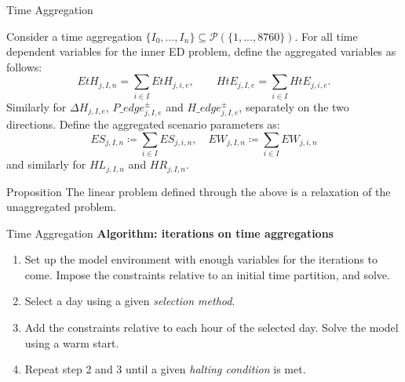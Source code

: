 \documentclass[pdf]{beamer}
\begin{document}
  \begin{frame}{Time Aggregation}


    \small
    Consider a time aggregation $\{I_0,...,I_n\}\subseteq \mathcal{P}(\{1,...,8760\})$.
    For all time dependent variables for the inner ED problem, define the aggregated variables as follows:
    \begin{equation*}
    EtH_{j,I,n} = \sum_{i \in I} EtH_{j,i,e}, \quad\quad HtE_{j,I,e} = \sum_{i \in I} HtE_{j,i,e}.
    \end{equation*}
    Similarly for \(\Delta H_{j,I,e}\), \(P\_edge^\pm_{j,I,e}\) and \(H\_edge^\pm_{j,I,e}\), separately on the two directions.
    Define the aggregated scenario parameters as:
    \[
    ES_{j,I,n} \coloneqq \sum_{i \in I} ES_{j,i,n}, \quad EW_{j,I,n} \coloneqq \sum_{i \in I} EW_{j,i,n}
    \]
    and similarly for \(HL_{j,I,n}\) and \(HR_{j,I,n}\). %
    
    \normalsize
    \begin{block}{Proposition}
      The linear problem defined through the above is a relaxation of the unaggregated problem.
    \end{block}

  \end{frame}
  \begin{frame}{Time Aggregation}
    \textbf{Algorithm: iterations on time aggregations}
    \begin{enumerate}
      \item Set up the model environment with enough variables for the iterations to come. Impose the constraints relative to an initial time partition, and solve.
      \item Select a day using a given \textit{selection method}.
      \item Add the constraints relative to each hour of the selected day. Solve the model using a warm start.
      \item Repeat step 2 and 3 until a given \textit{halting condition} is met.
      \end{enumerate}
  \end{frame}
\end{document}
